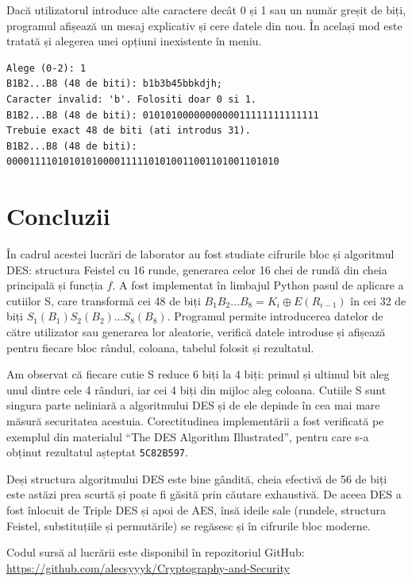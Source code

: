 \documentclass[12pt,a4paper]{article}
\begin{document}
Dacă utilizatorul introduce alte caractere decât 0 și 1 sau un număr greșit de
biți, programul afișează un mesaj explicativ și cere datele din nou. În același
mod este tratată și alegerea unei opțiuni inexistente în meniu.

\begin{lstlisting}[style=terminal, caption={Mesaje de eroare la introducerea datelor greșite}]
Alege (0-2): 1
B1B2...B8 (48 de biti): b1b3b45bbkdjh;
Caracter invalid: 'b'. Folositi doar 0 si 1.
B1B2...B8 (48 de biti): 0101010000000000011111111111111
Trebuie exact 48 de biti (ati introdus 31).
B1B2...B8 (48 de biti): 000011110101010100001111101010011001101001101010
\end{lstlisting}

\section{Concluzii}

În cadrul acestei lucrări de laborator au fost studiate cifrurile bloc și
algoritmul DES: structura Feistel cu 16 runde, generarea celor 16 chei de rundă
din cheia principală și funcția $f$. A fost implementat în limbajul Python pasul
de aplicare a cutiilor S, care transformă cei 48 de biți
$B_1B_2\dots B_8 = K_i \oplus E(R_{i-1})$ în cei 32 de biți
$S_1(B_1)S_2(B_2)\dots S_8(B_8)$. Programul permite introducerea datelor de către
utilizator sau generarea lor aleatorie, verifică datele introduse și afișează
pentru fiecare bloc rândul, coloana, tabelul folosit și rezultatul.

Am observat că fiecare cutie S reduce 6 biți la 4 biți: primul și ultimul bit
aleg unul dintre cele 4 rânduri, iar cei 4 biți din mijloc aleg coloana. Cutiile S
sunt singura parte neliniară a algoritmului DES și de ele depinde în cea mai mare
măsură securitatea acestuia. Corectitudinea implementării a fost verificată pe
exemplul din materialul \enquote{The DES Algorithm Illustrated}, pentru care s-a
obținut rezultatul așteptat \texttt{5C82B597}.

Deși structura algoritmului DES este bine gândită, cheia efectivă de 56 de biți
este astăzi prea scurtă și poate fi găsită prin căutare exhaustivă. De aceea DES a
fost înlocuit de Triple DES și apoi de AES, însă ideile sale (rundele, structura
Feistel, substituțiile și permutările) se regăsesc și în cifrurile bloc moderne.

Codul sursă al lucrării este disponibil în repozitoriul GitHub:\\
\url{https://github.com/alecsyyyk/Cryptography-and-Security}
\end{document}
